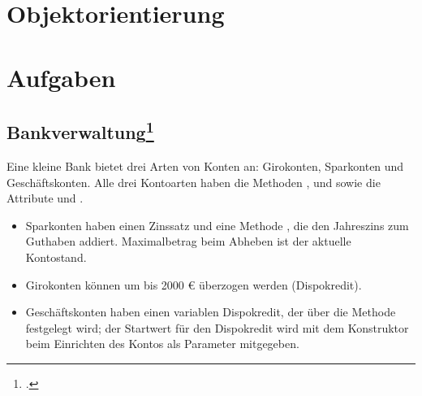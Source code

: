 \documentclass{lehramt-informatik}
\begin{document}

\chapter{Objektorientierung}


\chapter{Aufgaben}

\section{Bankverwaltung\footcite[Seite 60, Oldenburg, Informatik II, S. 128]{oomup:fs:3}}

Eine kleine Bank bietet drei Arten von Konten an: Girokonten, Sparkonten
und Geschäftskonten. Alle drei Kontoarten haben die Methoden
,  und  sowie die
Attribute  und .

\begin{itemize}
\item Sparkonten haben einen Zinssatz und eine Methode ,
die den Jahreszins zum Guthaben addiert. Maximalbetrag beim Abheben ist
der aktuelle Kontostand.

\item Girokonten können um bis 2000 € überzogen werden (Dispokredit).

\item Geschäftskonten haben einen variablen Dispokredit, der über die
Methode  festgelegt wird; der Startwert für den
Dispokredit wird mit dem Konstruktor beim Einrichten des Kontos als
Parameter mitgegeben.
\end{itemize}
\end{document}
